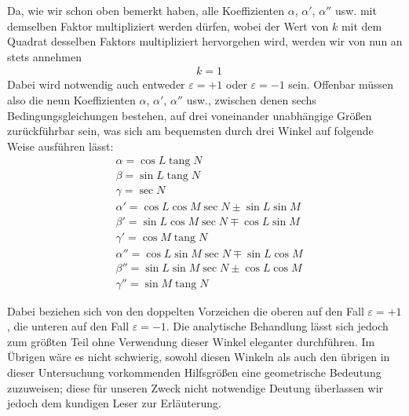 Da, wie wir schon oben bemerkt haben, alle Koeffizienten $\alpha$, $\alpha'$, $\alpha''$ usw. mit demselben Faktor multipliziert werden dürfen, wobei der Wert von $k$ mit dem Quadrat desselben Faktors multipliziert hervorgehen wird, werden wir von nun an stets annehmen
\[
\begin{aligned}
&k=1
\end{aligned}
\]
Dabei wird notwendig auch entweder $\varepsilon=+1$ oder $\varepsilon=-1$ sein. Offenbar müssen also die neun Koeffizienten $\alpha$, $\alpha'$, $\alpha''$ usw., zwischen denen sechs Bedingungsgleichungen bestehen, auf drei voneinander unabhängige Größen zurückführbar sein, was sich am bequemsten durch drei Winkel auf folgende Weise ausführen lässt:
\[
\begin{aligned}
&\alpha=\cos L\operatorname{tang}N\\[6pt]
&\beta=\sin L\operatorname{tang}N\\[6pt]
&\gamma=\sec N\\[6pt]
&\alpha'=\cos L\cos M\sec N\pm\sin L\sin M\\[6pt]
&\beta'=\sin L\cos M\sec N\mp\cos L\sin M\\[6pt]
&\gamma'=\cos M\operatorname{tang}N\\[6pt]
&\alpha''=\cos L\sin M\sec N\mp\sin L\cos M\\[6pt]
&\beta''=\sin L\sin M\sec N\pm\cos L\cos M\\[6pt]
&\gamma''=\sin M\operatorname{tang}N
\end{aligned}
\]

\noindent Dabei beziehen sich von den doppelten Vorzeichen die oberen auf den Fall $\varepsilon=+1$, die unteren auf den Fall $\varepsilon=-1$. Die analytische Behandlung lässt sich jedoch zum größten Teil ohne Verwendung dieser Winkel eleganter durchführen. Im Übrigen wäre es nicht schwierig, sowohl diesen Winkeln als auch den übrigen in dieser Untersuchung vorkommenden Hilfsgrößen eine geometrische Bedeutung zuzuweisen; diese für unseren Zweck nicht notwendige Deutung überlassen wir jedoch dem kundigen Leser zur Erläuterung.


\clearpage
\endgroup
